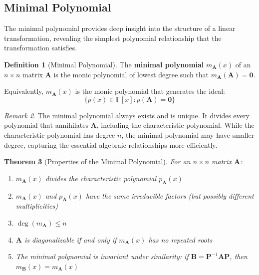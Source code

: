 \documentclass[12pt]{article}
\numberwithin{equation}{section}
\newcommand{\mat}[1]{\mathbf{#1}}        %
\theoremstyle{plain}
\newtheorem{theorem}{Theorem}[section]
\theoremstyle{definition}
\newtheorem{definition}[theorem]{Definition}
\theoremstyle{remark}
\newtheorem{remark}[theorem]{Remark}
\begin{document}
\subsection{Minimal Polynomial}

The minimal polynomial provides deep insight into the structure of a linear transformation, revealing the simplest polynomial relationship that the transformation satisfies.

\begin{definition}[Minimal Polynomial]
The \textbf{minimal polynomial} $m_{\mat{A}}(x)$ of an $n \times n$ matrix $\mat{A}$ is the monic polynomial of lowest degree such that $m_{\mat{A}}(\mat{A}) = \mat{0}$.

Equivalently, $m_{\mat{A}}(x)$ is the monic polynomial that generates the ideal:
$$\{p(x) \in \mathbb{F}[x] : p(\mat{A}) = \mat{0}\}$$
\end{definition}

\begin{remark}
The minimal polynomial always exists and is unique. It divides every polynomial that annihilates $\mat{A}$, including the characteristic polynomial. While the characteristic polynomial has degree $n$, the minimal polynomial may have smaller degree, capturing the essential algebraic relationships more efficiently.
\end{remark}

\begin{theorem}[Properties of the Minimal Polynomial]
For an $n \times n$ matrix $\mat{A}$:
\begin{enumerate}
\item $m_{\mat{A}}(x)$ divides the characteristic polynomial $p_{\mat{A}}(x)$
\item $m_{\mat{A}}(x)$ and $p_{\mat{A}}(x)$ have the same irreducible factors (but possibly different multiplicities)
\item $\deg(m_{\mat{A}}) \leq n$
\item $\mat{A}$ is diagonalizable if and only if $m_{\mat{A}}(x)$ has no repeated roots
\item The minimal polynomial is invariant under similarity: if $\mat{B} = \mat{P}^{-1}\mat{A}\mat{P}$, then $m_{\mat{B}}(x) = m_{\mat{A}}(x)$
\end{enumerate}
\end{theorem}
\end{document}
